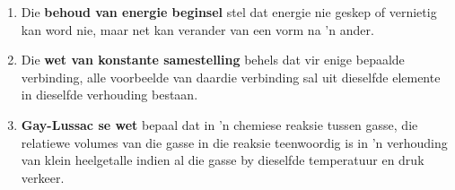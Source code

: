 \begin{enumerate}[noitemsep, label=\textbf{\arabic*}. ]
\label{m38711*uid49}\item Die \textbf{behoud van energie beginsel} stel dat energie nie geskep of vernietig kan word nie, maar net kan verander van een vorm na 'n ander.
\label{m38711*uid50}\item Die \textbf{wet van konstante samestelling} behels dat vir enige bepaalde verbinding, alle voorbeelde van daardie verbinding sal uit dieselfde elemente in dieselfde verhouding bestaan.
\label{m38711*uid51}\item \textbf{Gay-Lussac se wet} bepaal dat in 'n chemiese reaksie tussen gasse, die relatiewe volumes van die gasse in die reaksie teenwoordig is in 'n verhouding van klein heelgetalle indien al die gasse by dieselfde temperatuur en druk verkeer.
\end{enumerate}
\label{m38711*secfhsst!!!underscore!!!id584}
